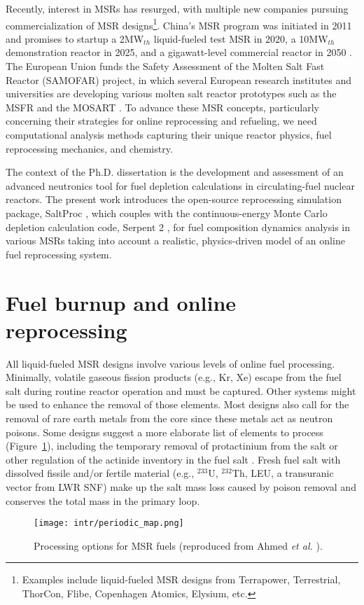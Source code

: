 Recently, interest in \glspl{MSR} has resurged, with multiple new companies 
pursuing commercialization of \gls{MSR} designs\footnote{Examples include 
liquid-fueled \gls{MSR} designs from Terrapower, Terrestrial, ThorCon, Flibe, 
Copenhagen Atomics, Elysium, etc.}. China's \gls{MSR} program was initiated in 
2011 and promises to startup a 2MW$_{th}$ liquid-fueled test \gls{MSR} in 
2020, a 10MW$_{th}$ demonstration reactor in 2025, and a gigawatt-level 
commercial reactor in 2050 \cite{zhang_review_2018}. The European 
Union funds the Safety Assessment of the Molten Salt Fast Reactor 
(SAMOFAR) project, in which several European research institutes and 
universities are developing various molten salt reactor prototypes 
such as the \gls{MSFR} \cite{fiorina_molten_2013} and the \gls{MOSART} 
\cite{ignatiev_molten_2014}. To advance these \gls{MSR} concepts, particularly 
concerning their strategies for online reprocessing and refueling, we need 
computational analysis methods capturing their unique reactor 
physics, fuel reprocessing mechanics, and chemistry.

The context of the Ph.D. dissertation is the development and assessment of an 
advanced neutronics tool for fuel depletion calculations in circulating-fuel 
nuclear reactors. The present work introduces the open-source reprocessing 
simulation package, SaltProc \cite{rykhlevskii_arfc/saltproc_2018}, which 
couples with the continuous-energy Monte Carlo depletion calculation code, 
Serpent 2 \cite{leppanen_serpent_2014}, for fuel composition dynamics analysis 
in various \glspl{MSR} taking into account a realistic, physics-driven
model of an online fuel reprocessing system.

\section{Fuel burnup and online reprocessing}\label{sec:litreview}
All liquid-fueled \gls{MSR} designs involve various levels of online fuel 
processing. Minimally, volatile gaseous fission products (e.g., Kr, Xe) 
escape from the fuel salt during routine reactor operation and must be 
captured. Other systems might be used to enhance the removal of those 
elements. Most designs also call for the removal of rare earth metals from 
the core since these metals act as neutron poisons. Some designs suggest a 
more elaborate list of elements to process (Figure~\ref{fig:periodic_tab}), 
including the temporary removal of protactinium from the salt or other 
regulation of the actinide inventory in the fuel salt 
\cite{ahmad_neutronics_2015}. Fresh fuel salt with dissolved fissile and/or 
fertile material (e.g., $^{233}$U, $^{232}$Th, \gls{LEU}, a transuranic 
vector from \gls{LWR} \gls{SNF}) make up the salt mass loss caused by poison 
removal and conserves the total mass in the primary loop.
\begin{figure}[htp!] %
	\centering
	\texttt{[image: intr/periodic\_map.png]}
	\caption{Processing options for \gls{MSR} fuels (reproduced from 
		Ahmed \emph{et al.} \cite{ahmad_neutronics_2015}).}
	\label{fig:periodic_tab}
\end{figure}


